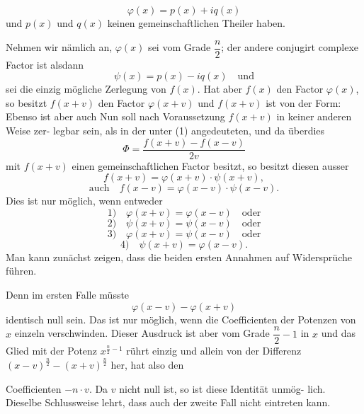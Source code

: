 \[ \varphi(x) = p(x) + iq(x) \]
und $p(x)$ und $q(x)$ keinen gemeinschaftlichen Theiler haben.

Nehmen wir nämlich an, $\varphi(x)$ sei vom Grade $\dfrac{n}{2}$; der andere
conjugirt complexe Factor ist alsdann
\[ \psi(x) = p(x) - iq(x) \quad \text{und} \]
sei die einzig mögliche Zerlegung von $f(x)$. Hat aber $f(x)$ den Factor
$\varphi(x)$, so besitzt $f(x+v)$ den Factor $\varphi(x+v)$ und $f(x+v)$ ist von
der Form:
Ebenso ist aber auch
Nun soll nach Voraussetzung $f(x+v)$ in keiner anderen Weise zer-
legbar sein, als in der unter (1) angedeuteten, und da überdies
\[ \Phi = \frac{f(x+v) - f(x-v)}{2v} \]
mit $f(x+v)$ einen gemeinschaftlichen Factor besitzt, so besitzt
diesen ausser
\[ f(x+v) = \varphi(x+v) \cdot \psi(x+v), \]
\[ \text{auch} \quad f(x-v) = \varphi(x-v) \cdot \psi(x-v). \]
Dies ist nur möglich, wenn entweder
\[ 1) \quad \varphi(x+v) = \varphi(x-v) \quad \text{oder} \]
\[ 2) \quad \psi(x+v) = \psi(x-v) \quad \text{oder} \]
\[ 3) \quad \varphi(x+v) = \psi(x-v) \quad \text{oder} \]
\[ 4) \quad \psi(x+v) = \varphi(x-v). \]
Man kann zunächst zeigen, dass die beiden ersten Annahmen auf
Widersprüche führen.

Denn im ersten Falle müsste
\[ \varphi(x-v) - \varphi(x+v) \]
identisch null sein. Das ist nur möglich, wenn die Coefficienten der
Potenzen von $x$ einzeln verschwinden. Dieser Ausdruck ist aber vom
Grade $\dfrac{n}{2} - 1$ in $x$ und das Glied mit der Potenz $x^{\frac{n}{2}-1}$ rührt einzig
und allein von der Differenz $(x-v)^{\frac{n}{2}} - (x+v)^{\frac{n}{2}}$ her, hat also den



Coefficienten $-n \cdot v$. Da $v$ nicht null ist, so ist diese Identität unmög-
lich. Dieselbe Schlussweise lehrt, dass auch der zweite Fall nicht
eintreten kann.

